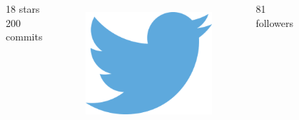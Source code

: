 \documentclass{beamer}
\begin{document}
\begin{frame}
\begin{columns}
\begin{figure}
        \label{fig:my_label}
    \end{figure}
    \begin{center}
        18 stars \\
        200 commits
    \end{center}
    \begin{figure}
        \centering
        \includegraphics[scale=0.13]{pres/img/conclusions/twitter.png}
        \label{fig:my_label}
    \end{figure}
    \begin{center}
        81 followers
    \end{center}
 \end{columns}
 
\end{frame}
\end{document}
